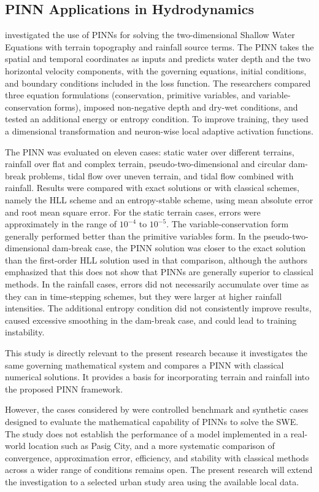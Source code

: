 \subsection{PINN Applications in Hydrodynamics}

 investigated the use of PINNs for solving the two-dimensional Shallow Water Equations with terrain topography and rainfall source terms. The PINN takes the spatial and temporal coordinates as inputs and predicts water depth and the two horizontal velocity components, with the governing equations, initial conditions, and boundary conditions included in the loss function. The researchers compared three equation formulations (conservation, primitive variables, and variable-conservation forms), imposed non-negative depth and dry-wet conditions, and tested an additional energy or entropy condition. To improve training, they used a dimensional transformation and neuron-wise local adaptive activation functions.

The PINN was evaluated on eleven cases: static water over different terrains, rainfall over flat and complex terrain, pseudo-two-dimensional and circular dam-break problems, tidal flow over uneven terrain, and tidal flow combined with rainfall. Results were compared with exact solutions or with classical schemes, namely the HLL scheme and an entropy-stable scheme, using mean absolute error and root mean square error. For the static terrain cases, errors were approximately in the range of $10^{-4}$ to $10^{-5}$. The variable-conservation form generally performed better than the primitive variables form. In the pseudo-two-dimensional dam-break case, the PINN solution was closer to the exact solution than the first-order HLL solution used in that comparison, although the authors emphasized that this does not show that PINNs are generally superior to classical methods. In the rainfall cases, errors did not necessarily accumulate over time as they can in time-stepping schemes, but they were larger at higher rainfall intensities. The additional entropy condition did not consistently improve results, caused excessive smoothing in the dam-break case, and could lead to training instability.

This study is directly relevant to the present research because it investigates the same governing mathematical system and compares a PINN with classical numerical solutions. It provides a basis for incorporating terrain and rainfall into the proposed PINN framework.

However, the cases considered by  were controlled benchmark and synthetic cases designed to evaluate the mathematical capability of PINNs to solve the SWE. The study does not establish the performance of a model implemented in a real-world location such as Pasig City, and a more systematic comparison of convergence, approximation error, efficiency, and stability with classical methods across a wider range of conditions remains open. The present research will extend the investigation to a selected urban study area using the available local data.

